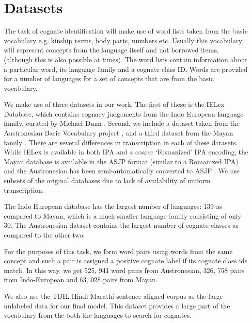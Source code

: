 \documentclass[11pt,letterpaper]{article}
\begin{document}
\section{Datasets}

The task of cognate identification will make use of word lists taken from the basic vocabulary e.g. kinship terms, body parts, numbers etc. Usually this vocabulary will represent concepts from the language itself and not borrowed items, (although this is also possible at times). The word lists contain information about a particular word, its language family and a cognate class ID. Words are provided for a number of languages for a set of concepts that are from the basic vocabulary.

We make use of three datasets in our work. The first of these is the IELex Database, which contains cognacy judgements from the Indo European language family, curated by Michael Dunn . Second, we include a dataset taken from the Austronesian Basic Vocabulary project \citep{greenhillBlust:08}, and a third dataset from the Mayan family \citep{wichmann:2008}. 
There are several differences in transcription in each of these datasets. While IELex is available in both IPA and a coarse `Romanized' IPA encoding, the Mayan database is available in the ASJP format (similar to a Romanized IPA) \citep{Brown:08} and the Austronesian has been semi-automatically converted to ASJP \citep{rama2016siamese}. We use subsets of the original databases due to lack of availability of uniform transcription.

The Indo European database has the largest number of languages: 139 as compared to Mayan, which is a much smaller language family consisting of only 30. The Austronesian dataset contains the largest number of cognate classes as compared to the other two.

For the purposes of this task, we form word pairs using words from the same concept and such a pair is assigned a positive cognate label if its cognate class ids match. In this way, we 
get 525, 941 word pairs from Austronesian, 326, 758 pairs from Indo-European and 63, 028 pairs from Mayan.

We also use the TDIL Hindi-Marathi sentence-aligned corpus as the large unlabeled data for our final model. This dataset provides a large part of the vocabulary from the both the languages to search for cognates.
\end{document}
